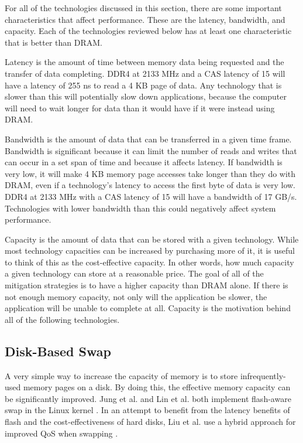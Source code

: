 \documentclass[doublespace,nopageskip]{VTthesis}
\begin{document}
For all of the technologies discussed in this section, there are some important characteristics that affect performance. These are the latency, bandwidth, and capacity. Each of the technologies reviewed below has at least one characteristic that is better than DRAM.

Latency is the amount of time between memory data being requested and the transfer of data completing. DDR4 at 2133 MHz and a CAS latency of 15 will have a latency of 255 ns to read a 4 KB page of data. Any technology that is slower than this will potentially slow down applications, because the computer will need to wait longer for data than it would have if it were instead using DRAM.

Bandwidth is the amount of data that can be transferred in a given time frame. Bandwidth is significant because it can limit the number of reads and writes that can occur in a set span of time and because it affects latency. If bandwidth is very low, it will make 4 KB memory page accesses take longer than they do with DRAM, even if a technology's latency to access the first byte of data is very low. DDR4 at 2133 MHz with a CAS latency of 15 will have a bandwidth of 17 GB/s. Technologies with lower bandwidth than this could negatively affect system performance.

Capacity is the amount of data that can be stored with a given technology. While most technology capacities can be increased by purchasing more of it, it is useful to think of this as the cost-effective capacity. In other words, how much capacity a given technology can store at a reasonable price. The goal of all of the mitigation strategies is to have a higher capacity than DRAM alone. If there is not enough memory capacity, not only will the application be slower, the application will be unable to complete at all. Capacity is the motivation behind all of the following technologies.

\subsection{Disk-Based Swap}\label{ss:disk-based_swap}
A very simple way to increase the capacity of memory is to store infrequently-used memory pages on a disk. By doing this, the effective memory capacity can be significantly improved. Jung et al. and Lin et al. both implement flash-aware swap in the Linux kernel \cite{fass,flashawareswap}. In an attempt to benefit from the latency benefits of flash and the cost-effectiveness of hard disks, Liu et al. use a hybrid approach for improved QoS when swapping \cite{hybridswap}.
\end{document}
